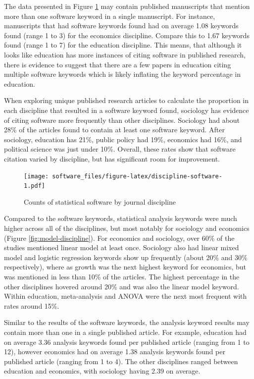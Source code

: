 \documentclass[
  english,
  ,man]{apa7}
\begin{document}
The data presented in Figure \ref{fig:discipline-software} may contain published manuscripts that mention more than one software keyword in a single manuscript. For instance, manuscripts that had software keywords found had on average 1.08 keywords found (range 1 to 3) for the economics discipline. Compare this to 1.67 keywords found (range 1 to 7) for the education discipline. This means, that although it looks like education has more instances of citing software in published research, there is evidence to suggest that there are a few papers in education citing multiple software keywords which is likely inflating the keyword percentage in education.

When exploring unique published research articles to calculate the proportion in each discipline that resulted in a software keyword found, sociology has evidence of citing software more frequently than other disciplines. Sociology had about 28\% of the articles found to contain at least one software keyword. After sociology, education has 21\%, public policy had 19\%, economics had 16\%, and political science was just under 10\%. Overall, these rates show that software citation varied by discipline, but has significant room for improvement.

\begin{figure}
\centering
\texttt{[image: software\_files/figure-latex/discipline-software-1.pdf]}
\caption{\label{fig:discipline-software}Counts of statistical software by journal discipline}
\end{figure}

Compared to the software keywords, statistical analysis keywords were much higher across all of the disciplines, but most notably for sociology and economics (Figure \ref{fig:model-discipline}). For economics and sociology, over 60\% of the studies mentioned linear model at least once. Sociology also had linear mixed model and logistic regression keywords show up frequently (about 20\% and 30\% respectively), where as growth was the next highest keyword for economics, but was mentioned in less than 10\% of the articles. The highest percentage in the other disciplines hovered around 20\% and was also the linear model keyword. Within education, meta-analysis and ANOVA were the next most frequent with rates around 15\%.

Similar to the results of the software keywords, the analysis keyword results may contain more than one in a single published article. For example, education had on average 3.36 analysis keywords found per published article (ranging from 1 to 12), however economics had on average 1.38 analysis keywords found per published article (ranging from 1 to 4). The other disciplines ranged between education and economics, with sociology having 2.39 on average.
\end{document}
